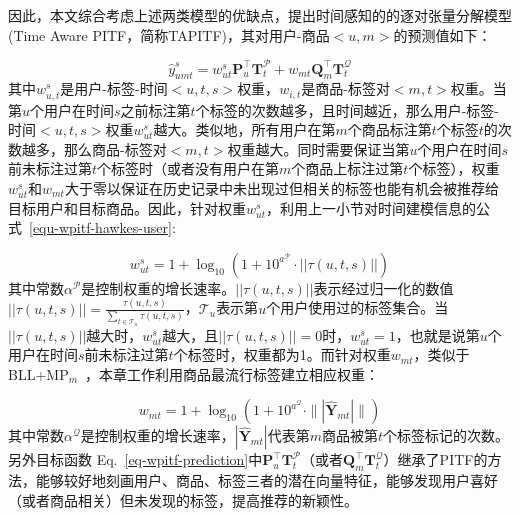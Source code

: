因此，本文综合考虑上述两类模型的优缺点，提出时间感知的的逐对张量分解模型(Time Aware PITF，简称TAPITF)，其对用户-商品$<u,m>$的预测值如下：

\begin{equation}
\label{eq-wpitf-prediction}
\hat{y}_{umt}^s=w_{ut}^{s}\mathbf{P}_u^\top\mathbf{T}_t^{\mathcal{P}}+w_{mt}\mathbf{Q}_m^\top\mathbf{T}_t^{\mathcal{Q}}
\end{equation}
其中$w_{u,t}^s$是用户-标签-时间$<u,t,s>$权重，$w_{i,t}$是商品-标签对$<m,t>$权重。当第$u$个用户在时间$s$之前标注第$t$个标签的次数越多，且时间越近，那么用户-标签-时间$<u,t,s>$权重$w_{ut}^s$越大。类似地，所有用户在第$m$个商品标注第$t$个标签$t$的次数越多，那么商品-标签对$<m,t>$权重越大。同时需要保证当第$u$个用户在时间$s$前未标注过第$t$个标签时（或者没有用户在第$m$个商品上标注过第$t$个标签），权重$w_{ut}^s$和$w_{mt}$大于零以保证在历史记录中未出现过但相关的标签也能有机会被推荐给目标用户和目标商品。因此，针对权重$w_{ut}^s$，利用上一小节对时间建模信息的公式~\ref{equ-wpitf-hawkes-user}:

\begin{equation}
\label{eq-weight-uts1}
w_{ut}^s =1 + \log_{10}(1+10^{a^\mathcal{P}}\cdot ||\tau(u,t,s)||)
\end{equation}	
其中常数$\alpha^\mathcal{P}$是控制权重的增长速率。$||\tau(u,t,s)||$表示经过归一化的数值$||\tau(u,t,s)|| = \frac{\tau(u,t,s)}{\sum_{t\in \mathcal{T}_u}\tau(u,t,s)}$，$\mathcal{T}_u$表示第$u$个用户使用过的标签集合。当$||\tau(u,t,s)||$越大时，$w_{ut}^s$越大，且$||\tau(u,t,s)||=0$时，$w_{ut}^s=1$，也就是说第$u$个用户在时间$s$前未标注过第$t$个标签时，权重都为1。而针对权重$w_{mt}$，类似于BLL+MP$_m$~\cite{kowald2014long}，本章工作利用商品最流行标签建立相应权重：


\begin{equation}
\label{eq-weight-it} w_{mt} = 1+\log_{10}(1+10^{a^\mathcal{Q}}\cdot \||\hat{\mathbf{Y}}_{mt}|\|)
\end{equation}
其中常数$\alpha^\mathcal{Q}$是控制权重的增长速率，$|\hat{\mathbf{Y}}_{mt}|$代表第$m$商品被第$t$个标签标记的次数。另外目标函数 Eq.~\ref{eq-wpitf-prediction}中$\mathbf{P}_u^\top\mathbf{T}_t^{\mathcal{P}}$（或者$\mathbf{Q}_m^\top\mathbf{T}_t^{\mathcal{Q}}$）继承了PITF的方法，能够较好地刻画用户、商品、标签三者的潜在向量特征，能够发现用户喜好（或者商品相关）但未发现的标签，提高推荐的新颖性。

